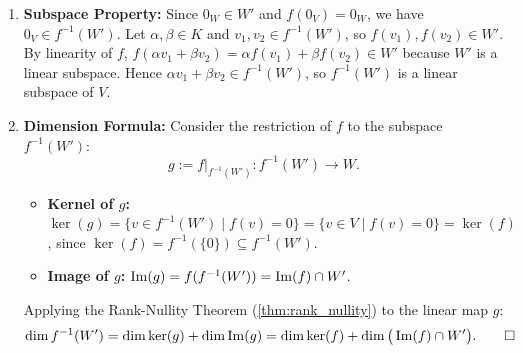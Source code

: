 \begin{exercisesolution}
\label{sol:preimage_subspace_dimension_formula}
\begin{enumerate}[label=\textbf{(\alph*)}]
    \item \textbf{Subspace Property:}
    Since $0_W \in W'$ and $f(0_V) = 0_W$, we have $0_V \in f^{-1}(W')$.
    Let $\alpha, \beta \in K$ and $v_1, v_2 \in f^{-1}(W')$, so $f(v_1), f(v_2) \in W'$.
    By linearity of $f$, $f(\alpha v_1 + \beta v_2) = \alpha f(v_1) + \beta f(v_2) \in W'$ because $W'$ is a linear subspace.
    Hence $\alpha v_1 + \beta v_2 \in f^{-1}(W')$, so $f^{-1}(W')$ is a linear subspace of $V$.

    \item \textbf{Dimension Formula:}
    Consider the restriction of $f$ to the subspace $f^{-1}(W')$:
    \[
    g := f|_{f^{-1}(W')} \colon f^{-1}(W') \to W.
    \]
    \begin{itemize}
        \item \textbf{Kernel of $g$:} $\ker(g) = \{v \in f^{-1}(W') \mid f(v) = 0\} = \{v \in V \mid f(v) = 0\} = \ker(f)$, since $\ker(f) = f^{-1}(\{0\}) \subseteq f^{-1}(W')$.
        \item \textbf{Image of $g$:} $\operatorname{Im}(g) = f(f^{-1}(W')) = \operatorname{Im}(f) \cap W'$.
    \end{itemize}
    Applying the Rank-Nullity Theorem (\cref{thm:rank_nullity}) to the linear map $g$:
    \[
    \dim f^{-1}(W') = \dim \ker(g) + \dim \operatorname{Im}(g) = \dim \ker(f) + \dim\big(\operatorname{Im}(f) \cap W'\big). \qedhere
    \]
\end{enumerate}
\end{exercisesolution}

